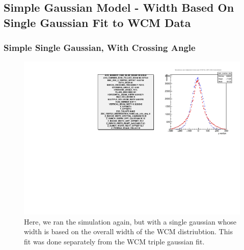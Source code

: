 \subsection{Simple Gaussian Model - Width Based On Single Gaussian Fit to WCM Data }
\begin{frame}
\frametitle{Simple Single Gaussian, With Crossing Angle}
\begin{figure}
\begin{center}
\includegraphics[width=\linewidth]{../OverlapTest/figs/359711_model3_angle_vertex.pdf}
\end{center}
\caption{Here, we ran the simulation again, but with a single gaussian whose
width is based on the overall width of the WCM distriubtion. This fit was done
separately from the WCM triple gaussian fit. }
\label{fig:359711_model3_angle_vertex}
\end{figure}
\end{frame}


